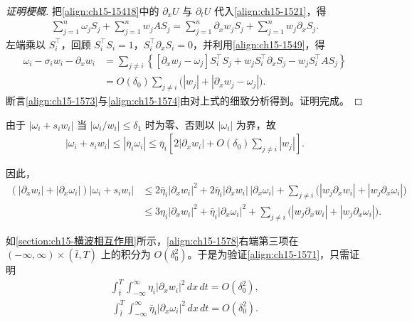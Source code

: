 \documentclass[../../main.tex]{subfiles}
\begin{document}
\begin{proof}[证明梗概]
把\eqref{align:ch15-15418}中的 $\partial_xU$ 与 $\partial_tU$ 代入\eqref{align:ch15-1521}，得
\begin{align}
\sum_{j=1}^n\omega_jS_j+\sum_{j=1}^nw_jAS_j=\sum_{j=1}^n\partial_xw_jS_j+\sum_{j=1}^nw_j\partial_xS_j.
\label{align:ch15-1575}
\end{align}
左端乘以 $S_i^\top$，回顾 $S_i^\top S_i=1$，$S_i^\top\partial_xS_i=0$，并利用\eqref{align:ch15-1549}，得
\begin{align}
\omega_i-\sigma_iw_i-\partial_xw_i&=\sum_{j\neq i}\left\{[\partial_xw_j-\omega_j]S_i^\top S_j+w_jS_i^\top\partial_xS_j-w_jS_i^\top AS_j\right\}\nonumber\\
&=O(\delta_0)\sum_{j\neq i}\bigl(|w_j|+|\partial_xw_j-\omega_j|\bigr).
\label{align:ch15-1576}
\end{align}
断言\eqref{align:ch15-1573}与\eqref{align:ch15-1574}由对上式的细致分析得到。证明完成。
\end{proof}

由于 $|\omega_i+s_iw_i|$ 当 $|\omega_i/w_i|\leqslant\delta_1$ 时为零、否则以 $|\omega_i|$ 为界，故
\begin{align}
|\omega_i+s_iw_i|\leqslant|\bar\eta_i\omega_i|\leqslant\bar\eta_i\left[2|\partial_xw_i|+O(\delta_0)\sum_{j\neq i}|w_j|\right].
\label{align:ch15-1577}
\end{align}

因此，
\begin{align}
(|\partial_xw_i|+|\partial_x\omega_i|)|\omega_i+s_iw_i|&\leqslant2\bar\eta_i|\partial_xw_i|^2+2\bar\eta_i|\partial_xw_i|\,|\partial_x\omega_i|+\sum_{j\neq i}\bigl(|w_j\partial_xw_i|+|w_j\partial_x\omega_i|\bigr)\nonumber\\
&\leqslant3\eta_i|\partial_xw_i|^2+\bar\eta_i|\partial_x\omega_i|^2+\sum_{j\neq i}\bigl(|w_j\partial_xw_i|+|w_j\partial_x\omega_i|\bigr).
\label{align:ch15-1578}
\end{align}

如\cref{section:ch15-横波相互作用}所示，\eqref{align:ch15-1578}右端第三项在 $(-\infty,\infty)\times(\bar t,T)$ 上的积分为 $O(\delta_0^2)$。于是为验证\eqref{align:ch15-1571}，只需证明
\begin{align}
\int_{\bar t}^{T}\int_{-\infty}^{\infty}\eta_i|\partial_xw_i|^2\,dx\,dt=O(\delta_0^2),
\label{align:ch15-1579}
\end{align}
\begin{align}
\int_{\bar t}^{T}\int_{-\infty}^{\infty}\bar\eta_i|\partial_x\omega_i|^2\,dx\,dt=O(\delta_0^2).
\label{align:ch15-15710}
\end{align}
\end{document}
